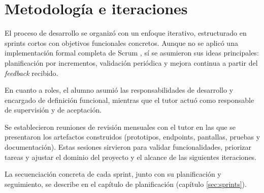 \newpage

\section{Metodología e iteraciones}

El proceso de desarrollo se organizó con un enfoque iterativo, estructurado en sprints cortos con objetivos funcionales concretos. Aunque no se aplicó una implementación formal completa de Scrum \cite{scrum}, sí se asumieron sus ideas principales: planificación por incrementos, validación periódica y mejora continua a partir del \emph{feedback} recibido.

En cuanto a roles, el alumno asumió las responsabilidades de desarrollo y encargado de definición funcional, mientras que el tutor actuó como responsable de supervisión y de aceptación.

Se establecieron reuniones de revisión mensuales con el tutor en las que se presentaron los artefactos construidos (prototipos, endpoints, pantallas, pruebas y documentación). Estas sesiones sirvieron para validar funcionalidades, priorizar tareas y ajustar el dominio del proyecto y el alcance de las siguientes iteraciones.

La secuenciación concreta de cada sprint, junto con su planificación y seguimiento, se describe en el capítulo de planificación (capítulo \ref{sec:sprints}).
